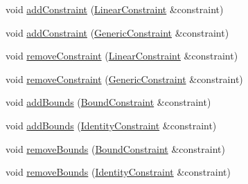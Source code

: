 {\bf }\par
\begin{DoxyCompactItemize}
\item 
void \hyperlink{classocra_1_1FSQPSolver_a086d7ebf9d84c60347303237e3896266}{add\+Constraint} (\hyperlink{namespaceocra_ae8b87cf4099be3efc3b410019ad2046e}{Linear\+Constraint} \&constraint)
\item 
void \hyperlink{classocra_1_1FSQPSolver_afefe2d2f4e3cbc39c22971adfe475c75}{add\+Constraint} (\hyperlink{namespaceocra_af10341108ce661566aad00908668e2b1}{Generic\+Constraint} \&constraint)
\item 
void \hyperlink{classocra_1_1FSQPSolver_a80df07f05ec30a6a6f38997149806273}{remove\+Constraint} (\hyperlink{namespaceocra_ae8b87cf4099be3efc3b410019ad2046e}{Linear\+Constraint} \&constraint)
\item 
void \hyperlink{classocra_1_1FSQPSolver_a80d729cccff0221d1afb8781c89bbc55}{remove\+Constraint} (\hyperlink{namespaceocra_af10341108ce661566aad00908668e2b1}{Generic\+Constraint} \&constraint)
\end{DoxyCompactItemize}

{\bf }\par
\begin{DoxyCompactItemize}
\item 
void \hyperlink{classocra_1_1FSQPSolver_abad7c2c61aab4511990533b4ae9a32ad}{add\+Bounds} (\hyperlink{namespaceocra_a6e55fff77635080219964abc301abf18}{Bound\+Constraint} \&constraint)
\item 
void \hyperlink{classocra_1_1FSQPSolver_ae51e651fc7b6bfb3b805c5d51279bc47}{add\+Bounds} (\hyperlink{namespaceocra_a5fc023ff4ef8f4b0cdf410e088090731}{Identity\+Constraint} \&constraint)
\item 
void \hyperlink{classocra_1_1FSQPSolver_a4dae031d10c7c4be13cd48de8588e69a}{remove\+Bounds} (\hyperlink{namespaceocra_a6e55fff77635080219964abc301abf18}{Bound\+Constraint} \&constraint)
\item 
void \hyperlink{classocra_1_1FSQPSolver_a71f05cbd4b27427250eaa8207f42974f}{remove\+Bounds} (\hyperlink{namespaceocra_a5fc023ff4ef8f4b0cdf410e088090731}{Identity\+Constraint} \&constraint)
\end{DoxyCompactItemize}

